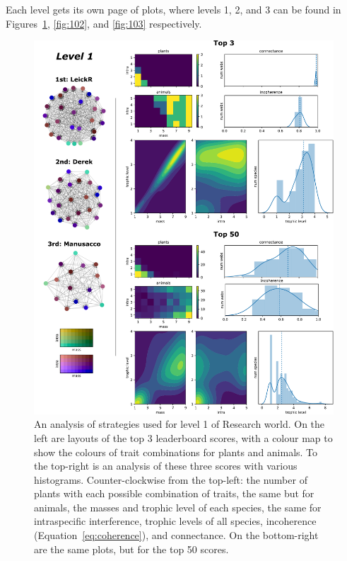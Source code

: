 Each level gets its own page of plots, where levels 1, 2, and 3 can be found in Figures~\ref{fig:101}, \ref{fig:102}, and \ref{fig:103} respectively.
\begin{figure}
  \centering
  \includegraphics[height=.85\textheight, right]{joy/101.pdf}
  \caption[Results from Research World level 1]{An analysis of strategies used for level 1 of Research world. On the left are layouts of the top 3 leaderboard scores, with a colour map to show the colours of trait combinations for plants and animals.
  To the top-right is an analysis of these three scores with various histograms. Counter-clockwise from the top-left: the number of plants with each possible combination of traits, the same but for animals, the masses and trophic level of each species, the same for intraspecific interference, trophic levels of all species, incoherence (Equation~\eqref{eq:coherence}), and connectance. On the bottom-right are the same plots, but for the top 50 scores.}
  \label{fig:101}
\end{figure}

